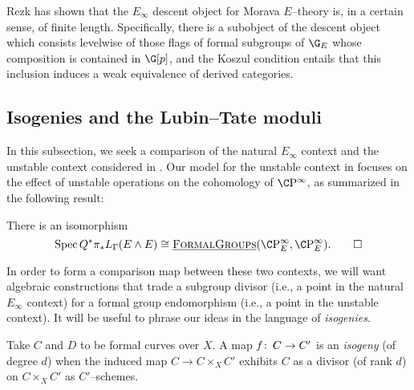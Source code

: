 \begin{remark}
Rezk has shown that the \(E_\infty\) descent object for Morava \(E\)--theory is, in a certain sense, of finite length.  Specifically, there is a subobject of the descent object which consists levelwise of those flags of formal subgroups of \(\G_E\) whose composition is contained in \(\G[p]\), and the Koszul condition entails that this inclusion induces a weak equivalence of derived categories.
\end{remark}










\subsection*{Isogenies and the Lubin--Tate moduli}\label{IsogeniesSection}

In this subsection, we seek a comparison of the natural \(E_\infty\) context and the unstable context considered in .  Our model for the unstable context in  focuses on the effect of unstable operations on the cohomology of \(\CP^\infty\), as summarized in the following result:

\begin{lemma}\label{UnstableEthyCooperations}
There is an isomorphism \[\Spec Q^* \pi_* L_\Gamma(E \sm E) \cong \InternalHom{FormalGroups}(\CP^\infty_E, \CP^\infty_E). \qed\]
\end{lemma}

\noindent In order to form a comparison map between these two contexts, we will want algebraic constructions that trade a subgroup divisor (i.e., a point in the natural \(E_\infty\) context) for a formal group endomorphism (i.e., a point in the unstable context).  It will be useful to phrase our ideas in the language of \textit{isogenies}.

\begin{definition}
Take \(C\) and \(D\) to be formal curves over \(X\).  A map \(f\colon\thinspace C \to C'\) is an \textit{isogeny} (of degree \(d\)) when the induced map \(C \to C \times_X C'\) exhibits \(C\) as a divisor (of rank \(d\)) on \(C \times_X C'\) as \(C'\)--schemes.
\end{definition}

